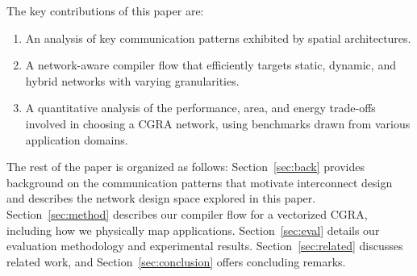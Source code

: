 The key contributions of this paper are:
\begin{enumerate}
    \item An analysis of key communication patterns exhibited by spatial architectures.
    \item A network-aware compiler flow that efficiently targets static, dynamic, and hybrid
      networks with varying granularities.
    \item A quantitative analysis of the performance, area, and energy trade-offs involved in choosing a CGRA network, using benchmarks drawn from various application domains.
\end{enumerate}

The rest of the paper is organized as follows:
Section~\ref{sec:back} provides background on the communication patterns that motivate interconnect design and describes the network design space explored in this paper.
Section~\ref{sec:method} describes our compiler flow for a vectorized CGRA, including how we physically map applications.
Section~\ref{sec:eval} details our evaluation methodology and experimental results.
Section~\ref{sec:related} discusses related work, and Section~\ref{sec:conclusion} offers concluding remarks.


